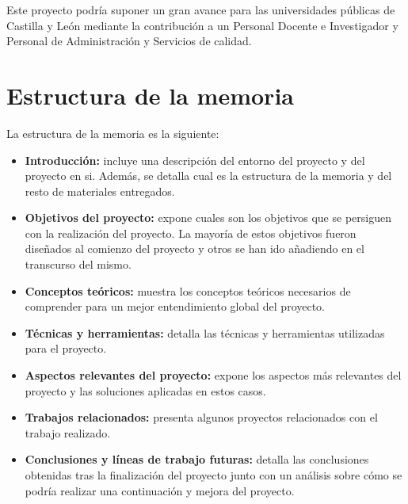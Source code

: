 Este proyecto podría suponer un gran avance para las universidades públicas de Castilla y León mediante la contribución a un Personal Docente e Investigador y Personal de Administración y Servicios de calidad.

\section{Estructura de la memoria}

La estructura de la memoria es la siguiente:

\begin{itemize}
    \item \textbf{Introducción:}  incluye una descripción del entorno del proyecto y del proyecto en si. Además, se detalla cual es la estructura de la memoria y del resto de materiales entregados.
    \item \textbf{Objetivos del proyecto:} expone cuales son los objetivos que se persiguen con la realización del proyecto. La mayoría de estos objetivos fueron diseñados al comienzo del proyecto y otros se han ido añadiendo en el transcurso del mismo.
    \item \textbf{Conceptos teóricos:} muestra los conceptos teóricos necesarios de comprender para un mejor entendimiento global del proyecto.
    \item \textbf{Técnicas y herramientas:} detalla las técnicas y herramientas utilizadas para el proyecto.
    \item \textbf{Aspectos relevantes del proyecto:}  expone los aspectos más relevantes del proyecto y las soluciones aplicadas en estos casos.  
    \item \textbf{Trabajos relacionados:} presenta algunos proyectos relacionados con el trabajo realizado.
    \item \textbf{Conclusiones y líneas de trabajo futuras:} detalla las conclusiones obtenidas tras la finalización del proyecto junto con un análisis sobre cómo se podría realizar una continuación y mejora del proyecto.    
\end{itemize}

